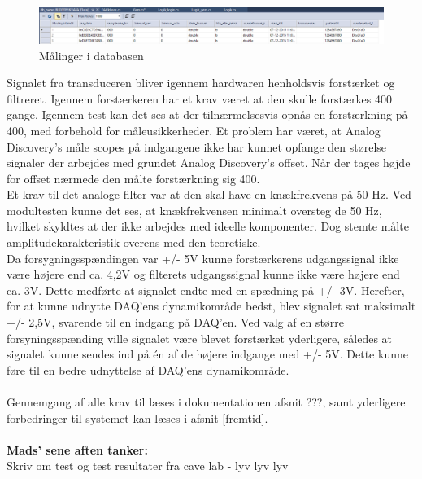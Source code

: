 \begin{figure}[H]
	\centering
	\includegraphics[width=1.1\textwidth]{Figurer/SoftwareImplementering/databasegem}
	\caption{Målinger i databasen}
	\label{databasegem}
\end{figure}

Signalet fra transduceren bliver igennem hardwaren henholdsvis forstærket og filtreret. Igennem forstærkeren har et krav været at den skulle forstærkes 400 gange. Igennem test kan det ses at der tilnærmelsesvis opnås en forstærkning på 400, med forbehold for måleusikkerheder. Et problem har været, at Analog Discovery’s måle scopes på indgangene ikke har kunnet opfange den størelse signaler der arbejdes med grundet Analog Discovery’s offset. Når der tages højde for offset nærmede den målte forstærkning sig 400. \\
Et krav til det analoge filter var at den skal have en knækfrekvens på 50 Hz. Ved modultesten kunne det ses, at knækfrekvensen minimalt oversteg de 50 Hz, hvilket skyldtes at der ikke arbejdes med ideelle komponenter. Dog stemte målte amplitudekarakteristik overens med den teoretiske. \\
Da forsygningsspændingen var +/- 5V kunne forstærkerens udgangssignal ikke være højere end ca. 4,2V og filterets udgangssignal kunne ikke være højere end ca. 3V. Dette medførte at signalet endte med en spædning på +/- 3V. Herefter, for at kunne udnytte DAQ’ens dynamikområde bedst, blev signalet sat maksimalt +/- 2,5V, svarende til en indgang på DAQ’en. Ved valg af en større forsyningsspænding ville signalet være blevet forstærket yderligere, således at signalet kunne sendes ind på én af de højere indgange med +/- 5V. Dette kunne føre til en bedre udnyttelse af DAQ'ens dynamikområde.\\
\\
Gennemgang af alle krav til læses i dokumentationen afsnit ???, samt yderligere forbedringer til systemet kan læses i afsnit \ref{fremtid}.\\
\\
\textbf{Mads' sene aften tanker:}\\
Skriv om test og test resultater fra cave lab - lyv lyv lyv


